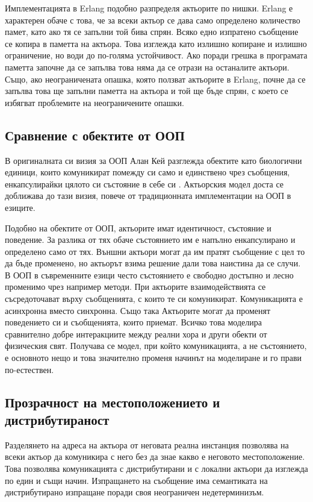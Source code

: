 Имплементацията в Erlang подобно разпределя актьорите по нишки. Erlang е характерен обаче с това, че за всеки актьор се дава само определено количество памет, като ако тя се запълни той бива спрян. Всяко едно изпратено съобщение се копира в паметта на актьора. Това изглежда като излишно копиране и излишно ограничение, но води до по-голяма устойчивост. Ако поради грешка в програмата паметта започне да се запълва това няма да се отрази на останалите актьори. Също, ако неограничената опашка, която ползват актьорите в Erlang, почне да се запълва това ще запълни паметта на актьора и той ще бъде спрян, с което се избягват проблемите на неограничените опашки.

\subsection{Сравнение с обектите от ООП}

В оригиналната си визия за ООП Алан Кей разглежда обектите като биологични единици, които комуникират помежду си само и единствено чрез съобщения, енкапсулирайки цялото си състояние в себе си \cite{key2003AboutOOP}. Актьорския модел доста се доближава до тази визия, повече от традиционната имплементации на ООП в езиците.

Подобно на обектите от ООП, актьорите имат идентичност, състояние и поведение. За разлика от тях обаче състоянието им е напълно енкапсулирано и определено само от тях. Външни актьори могат да им пратят съобщение с цел то да бъде променено, но актьорът взима решение дали това наистина да се случи. В ООП в съвременните езици често състоянието е свободно достъпно и лесно променимо чрез например  методи. При актьорите взаимодействията се съсредоточават върху съобщенията, с които те си комуникират. Комуникацията е асинхронна вместо синхронна. Също така Актьорите могат да променят поведението си и съобщенията, които приемат. Всичко това моделира сравнително добре интеракциите между реални хора и други обекти от физическия свят. Получава се модел, при който комуникацията, а не състоянието, е основното нещо и това значително променя начинът на моделиране и го прави по-естествен.

\subsection{Прозрачност на местоположението и дистрибутираност}

Разделянето на адреса на актьора от неговата реална инстанция позволява на всеки актьор да комуникира с него без да знае какво е неговото местоположение. Това позволява комуникацията с дистрибутирани и с локални актьори да изглежда по един и същи начин. Изпращането на съобщение има семантиката на дистрибутирано изпращане поради своя неограничен недетерминизъм.

